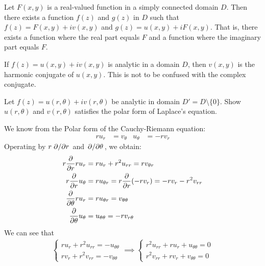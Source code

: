 \documentclass[12pt, english]{book}
\makeatletter
\renewenvironment{proof}[1][\proofname]{\par
	\pushQED{\qed}%
	\normalfont \topsep6\p@\@plus6\p@\relax
	\list{}{%
		\settowidth{\leftmargin}{\itshape\proofname:\hskip\labelsep}%
		\setlength{\labelwidth}{0pt}%
		\setlength{\itemindent}{-\leftmargin}%
		}%
	\item[\hskip\labelsep\itshape#1\@addpunct{:}]\ignorespaces
	}{\popQED\endlist\@endpefalse}
\makeatother
\begin{document}
	\begin{corollary}
		Let \(F(x,y)\) is a real-valued function in a simply connected domain \(D\). Then there exists a function \(f(z)\) and \(g(z)\) in \(D\) such that \(f(z) = F(x,y) + iv(x,y)\) and \(g(z) = u(x,y) + iF(x,y)\). That is, there exists a function where the real part equals \(F\) and a function where the imaginary part equals \(F\).
	\end{corollary}

	\begin{definition} 
		\label{Harmonic Conjugate Definition - Complex}
		If \(f(z) = u(x,y) + iv(x,y)\) is analytic in a domain \(D\), then \(v(x,y)\) is the harmonic conjugate of \(u(x,y)\). This is not to be confused with the complex conjugate.
	\end{definition}
	
	\begin{example}
		\label{Laplace's Equation (Polar) Exercise - Complex}
		Let \(f(z) = u(r, \theta) + iv(r, \theta)\) be analytic in domain \(D' = D \setminus \{0\}\). Show \(u(r, \theta)\) and \(v(r, \theta)\) satisfies the polar form of Laplace's equation.
		\begin{proof}{\color{Grey}
			We know from the Polar form of the Cauchy-Riemann equation:
			\begin{align*}
				ru_r &= v_\theta & u_\theta &= -rv_r
			\end{align*}
			Operating by \(r \pdv*{r}\) and \(\pdv*{\theta}\), we obtain:
			\begin{align*}
				r \pdv{r} r u_r &= ru_r + r^2 u_{rr} = r v_{\theta r} \\
				r \pdv{r} u_\theta &= ru_{\theta r} = r \pdv{r} (-rv_r) = -rv_r - r^2v_{rr} \\
				\pdv{\theta} ru_{r} &= r u_{\theta r} = v_{\theta \theta} \\
				\pdv{\theta} u_\theta &= u_{\theta \theta} = -r v_{r \theta}
			\end{align*}
			We can see that 
			\begin{align*}
				\begin{cases}
					ru_r + r^2 u_{rr} = -u_{\theta \theta} \\
					rv_r + r^2 v_{rr} = -v_{\theta \theta}
				\end{cases}
				\implies
				\begin{cases}
					r^2 u_{rr} + ru_r + u_{\theta \theta} = 0 \\
					r^2 v_{rr} + rv_r + v_{\theta \theta} = 0
				\end{cases}
			\end{align*}
			}
		\end{proof}
	\end{example}
\end{document}

